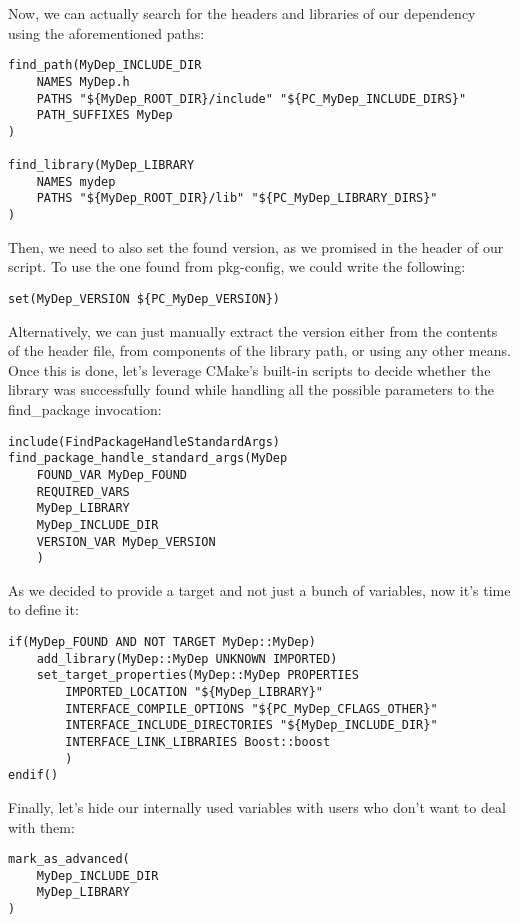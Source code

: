 Now, we can actually search for the headers and libraries of our dependency using the aforementioned paths:

\begin{lstlisting}[style=styleCMake]
find_path(MyDep_INCLUDE_DIR
	NAMES MyDep.h
	PATHS "${MyDep_ROOT_DIR}/include" "${PC_MyDep_INCLUDE_DIRS}"
	PATH_SUFFIXES MyDep
)

find_library(MyDep_LIBRARY
	NAMES mydep
	PATHS "${MyDep_ROOT_DIR}/lib" "${PC_MyDep_LIBRARY_DIRS}"
)
\end{lstlisting}

Then, we need to also set the found version, as we promised in the header of our script. To use the one found from pkg-config, we could write the following:

\begin{lstlisting}[style=styleCMake]
set(MyDep_VERSION ${PC_MyDep_VERSION})
\end{lstlisting}

Alternatively, we can just manually extract the version either from the contents of the header file, from components of the library path, or using any other means. Once this is done, let's leverage CMake's built-in scripts to decide whether the library was successfully found while handling all the possible parameters to the find\_package invocation:

\begin{lstlisting}[style=styleCMake]
include(FindPackageHandleStandardArgs)
find_package_handle_standard_args(MyDep
	FOUND_VAR MyDep_FOUND
	REQUIRED_VARS
	MyDep_LIBRARY
	MyDep_INCLUDE_DIR
	VERSION_VAR MyDep_VERSION
	)
\end{lstlisting}

As we decided to provide a target and not just a bunch of variables, now it's time to define it:

\begin{lstlisting}[style=styleCMake]
if(MyDep_FOUND AND NOT TARGET MyDep::MyDep)
	add_library(MyDep::MyDep UNKNOWN IMPORTED)
	set_target_properties(MyDep::MyDep PROPERTIES
		IMPORTED_LOCATION "${MyDep_LIBRARY}"
		INTERFACE_COMPILE_OPTIONS "${PC_MyDep_CFLAGS_OTHER}"
		INTERFACE_INCLUDE_DIRECTORIES "${MyDep_INCLUDE_DIR}"
		INTERFACE_LINK_LIBRARIES Boost::boost
		)
endif()
\end{lstlisting}

Finally, let's hide our internally used variables with users who don't want to deal with them:

\begin{lstlisting}[style=styleCMake]
mark_as_advanced(
	MyDep_INCLUDE_DIR
	MyDep_LIBRARY
)
\end{lstlisting}


